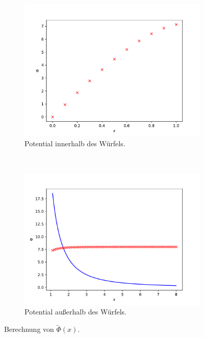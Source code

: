 \begin{figure}
  \centering
  \begin{subfigure}[b]{0.45\textwidth}
      \includegraphics[width=\textwidth]{A2/build/innerhalb_b.pdf}
      \caption{Potential innerhalb des Würfels.}
      \label{fig:inn_b}
    \end{subfigure}
    ~ %
    \begin{subfigure}[b]{0.45\textwidth}
      \includegraphics[width=\textwidth]{A2/build/ausserhalb_b.pdf}
      \caption{Potential außerhalb des Würfels.}
      \label{fig:aus_b}
    \end{subfigure}
    \caption{Berechnung von \(\tilde{\Phi}(x)\).}\label{fig:b}
\end{figure}
